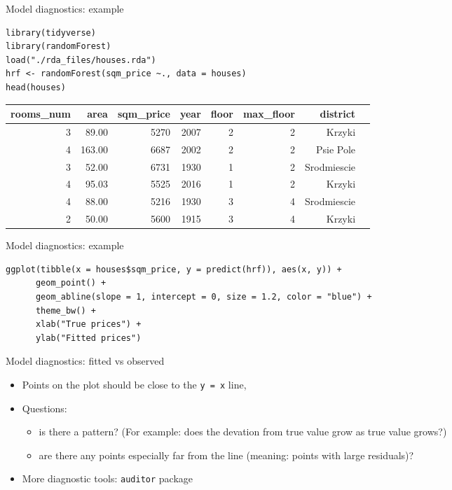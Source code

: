 \documentclass[xcolor={dvipsnames}]{beamer}
\begin{document}
\begin{frame}[fragile]{Model diagnostics: example}

		\begin{lstlisting}
library(tidyverse)
library(randomForest)
load("./rda_files/houses.rda")
hrf <- randomForest(sqm_price ~., data = houses)
head(houses)
		\end{lstlisting}
		\begin{table}[ht]
			\centering
			\begin{tabular}{rrrrrrrl}
				\hline
				 rooms\_num & area & sqm\_price & year & floor & max\_floor & district \\ 
				\hline
				  3 & 89.00 & 5270 & 2007 &   2 &   2 & Krzyki \\ 
				  4 & 163.00 & 6687 & 2002 &   2 &   2 & Psie Pole \\ 
				  3 & 52.00 & 6731 & 1930 &   1 &   2 & Srodmiescie \\ 
				  4 & 95.03 & 5525 & 2016 &   1 &   2 & Krzyki \\ 
				  4 & 88.00 & 5216 & 1930 &   3 &   4 & Srodmiescie \\ 
				  2 & 50.00 & 5600 & 1915 &   3 &   4 & Krzyki \\ 
				\hline
			\end{tabular}
		\end{table}
\end{frame}

\begin{frame}[fragile]{Model diagnostics: example}
	\begin{lstlisting}
ggplot(tibble(x = houses$sqm_price, y = predict(hrf)), aes(x, y)) +
	  geom_point() +
	  geom_abline(slope = 1, intercept = 0, size = 1.2, color = "blue") +
	  theme_bw() +
	  xlab("True prices") +
	  ylab("Fitted prices")
	\end{lstlisting}
\end{frame}

\begin{frame}[fragile]{Model diagnostics: fitted vs observed}
	\begin{itemize}
		\item Points on the plot should be close to the \texttt{y = x} line,
		
		\item Questions:
		
		    \begin{itemize}
		    	
		    	\item is there a pattern? (For example: does the devation from true value grow as true value grows?)
		    	
		    	\item are there any points especially far from the line (meaning: points with large residuals)?
		    	
		    \end{itemize}
		
		\item More diagnostic tools: \texttt{auditor} package
	\end{itemize}
\end{frame}
\end{document}
